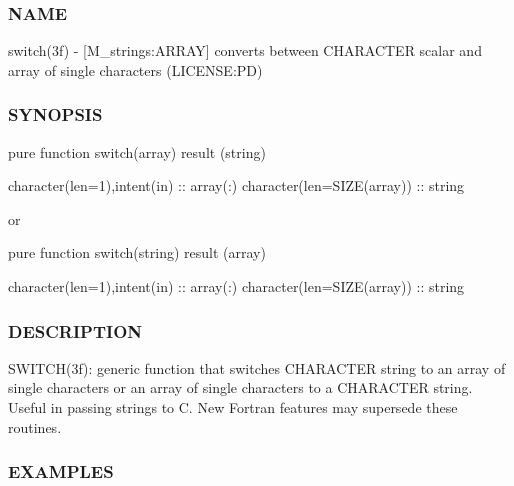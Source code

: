 \subsubsection*{N\+A\+ME}

switch(3f) -\/ \mbox{[}M\+\_\+strings\+:A\+R\+R\+AY\mbox{]} converts between C\+H\+A\+R\+A\+C\+T\+ER scalar and array of single characters (L\+I\+C\+E\+N\+SE\+:PD)

\subsubsection*{S\+Y\+N\+O\+P\+S\+IS}

\begin{DoxyVerb}pure function switch(array) result (string)

 character(len=1),intent(in) :: array(:)
 character(len=SIZE(array))  :: string

  or

pure function switch(string) result (array)

 character(len=1),intent(in) :: array(:)
 character(len=SIZE(array))  :: string
\end{DoxyVerb}
 \subsubsection*{D\+E\+S\+C\+R\+I\+P\+T\+I\+ON}

\begin{DoxyVerb}SWITCH(3f): generic function that switches CHARACTER string to an array
of single characters or an array of single characters to a CHARACTER
string. Useful in passing strings to C. New Fortran features may
supersede these routines.
\end{DoxyVerb}


\subsubsection*{E\+X\+A\+M\+P\+L\+ES}

